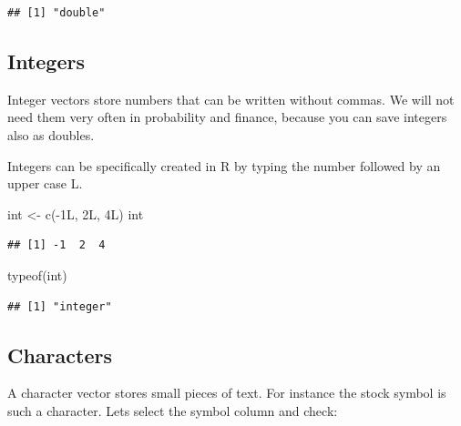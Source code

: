 \documentclass[
]{book}
\newenvironment{Shaded}{\begin{snugshade}}{\end{snugshade}}
\newcommand{\FunctionTok}[1]{\textcolor[rgb]{0.00,0.00,0.00}{#1}}
\newcommand{\NormalTok}[1]{#1}
\newcommand{\OtherTok}[1]{\textcolor[rgb]{0.56,0.35,0.01}{#1}}
\newcommand{\SpecialCharTok}[1]{\textcolor[rgb]{0.00,0.00,0.00}{#1}}
\begin{document}
\begin{verbatim}
## [1] "double"
\end{verbatim}

\hypertarget{integers}{%
\subsection{Integers}\label{integers}}

Integer vectors store numbers that can be written without commas. We will not need them
very often in probability and finance, because you can save integers also as doubles.

Integers can be specifically created in R by typing the number followed by an upper case L.

\begin{Shaded}
\begin{Highlighting}[]
\NormalTok{int }\OtherTok{\textless{}{-}} \FunctionTok{c}\NormalTok{(}\SpecialCharTok{{-}}\NormalTok{1L, 2L, 4L)}
\NormalTok{int}
\end{Highlighting}
\end{Shaded}

\begin{verbatim}
## [1] -1  2  4
\end{verbatim}

\begin{Shaded}
\begin{Highlighting}[]
\FunctionTok{typeof}\NormalTok{(int)}
\end{Highlighting}
\end{Shaded}

\begin{verbatim}
## [1] "integer"
\end{verbatim}

\hypertarget{characters}{%
\subsection{Characters}\label{characters}}

A character vector stores small pieces of text. For instance the stock symbol is
such a character. Lets select the symbol column and check:

\begin{Shaded}
\end{Shaded}
\end{document}

